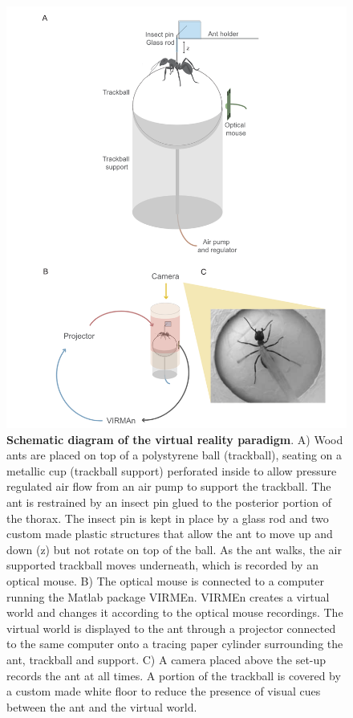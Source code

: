\begin{figure}
\centering
\includegraphics[width=\hsize]{figures/setup.png}
\caption{\textbf{Schematic diagram of the virtual reality paradigm}. A) Wood ants are placed on top of a polystyrene ball (trackball), seating on a metallic cup (trackball support) perforated inside to allow pressure regulated air flow from an air pump to support the trackball. The ant is restrained by an insect pin glued to the posterior portion of the thorax. The insect pin is kept in place by a glass rod and two custom made plastic structures that allow the ant to move up and down (z) but not rotate on top of the ball. As the ant walks, the air supported trackball moves underneath, which is recorded by an optical mouse. B) The optical mouse is connected to a computer running the Matlab package VIRMEn. VIRMEn creates a virtual world and changes it according to the optical mouse recordings. The virtual world is displayed to the ant through a projector connected to the same computer onto a tracing paper cylinder surrounding the ant, trackball and support. C) A camera placed above the set-up records the ant at all times. A portion of the trackball is covered by a custom made white floor to reduce the presence of visual cues between the ant and the virtual world.
}
\label{fig:setup}
\end{figure}



